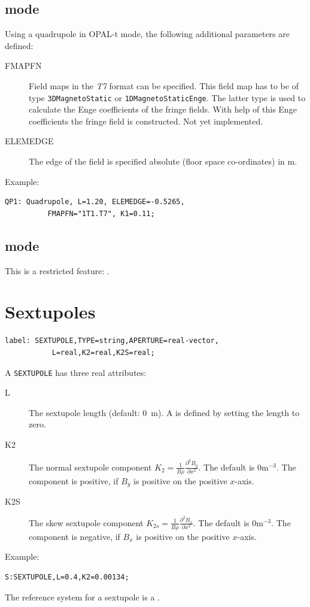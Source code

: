 \subsection{\opalt mode}
\label{sec:quadrupole-t}
Using a quadrupole in OPAL-t mode, the following additional parameters are defined:
\begin{description}
\item[FMAPFN]
  Field maps in the {\em T7} format can be specified. This field map has to be of type \texttt{3DMagnetoStatic}
  or \texttt{1DMagnetoStaticEnge}. The latter type is used to calculate the Enge coefficients of the fringe fields.
  With help of this Enge coefficients the fringe field is constructed. Not yet implemented.
\item[ELEMEDGE]
  The edge of the field is specified absolute (floor space co-ordinates) in m.
  \end{description}
\noindent Example:
\begin{verbatim}
QP1: Quadrupole, L=1.20, ELEMEDGE=-0.5265, 
          FMAPFN="1T1.T7", K1=0.11;
\end{verbatim}

\subsection{\opalcycl mode}

This is a restricted feature:  \noopalcycl .

\section{Sextupoles}
\label{sec:sextupole}
\begin{verbatim}
label: SEXTUPOLE,TYPE=string,APERTURE=real-vector,
           L=real,K2=real,K2S=real;
\end{verbatim}
A \texttt{SEXTUPOLE} has three real attributes:
\begin{description}
\item[L]
  The sextupole length (default: 0~m).
  A  is defined by setting the length to zero.
\item[K2]
  The normal sextupole component
  $K_2=\frac{1}{B \rho}\frac{\partial^2 B_y}{\partial x^2}$.
  The default is $0 \mathrm{m}^{-3}$.
  The component is positive, if $B_y$ is positive on the positive $x$-axis.
\item[K2S]
  The skew sextupole component
  $K_{2s}=\frac{1}{B \rho}\frac{\partial^2 B_x}{\partial x^2}$.
  The default is $0 \mathrm{m}^{-3}$.
  The component is negative, if $B_x$ is positive on the positive $x$-axis.
\end{description}
\noindent Example:
\begin{verbatim}
S:SEXTUPOLE,L=0.4,K2=0.00134;
\end{verbatim}
The reference system for a sextupole is a 
.
